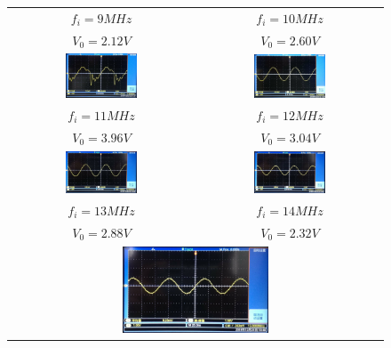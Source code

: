 \documentclass[12pt]{article}%
\numberwithin{equation}{section}
\begin{document}
\begin{enumerate}
\begin{figure}[htbp]
\begin{tabular}{cc}
$f_i=9MHz$&$f_i=10MHz$\\
$V_0=2.12V$&$V_0=2.60V$\\
\includegraphics[width=0.4\textwidth]{gaopin4/gaopin410.jpg}&\includegraphics[width=0.4\textwidth]{gaopin4/gaopin413.jpg}\\
$f_i=11MHz$&$f_i=12MHz$\\
$V_0=3.96V$&$V_0=3.04V$\\
\includegraphics[width=0.4\textwidth]{gaopin4/gaopin412.jpg}&\includegraphics[width=0.4\textwidth]{gaopin4/gaopin411.jpg}\\
$f_i=13MHz$&$f_i=14MHz$\\
$V_0=2.88V$&$V_0=2.32V$\\
\multicolumn{2}{c}{\includegraphics[width=0.4\textwidth]{gaopin4/gaopin414.jpg}}\\

\end{tabular}
\end{figure}
\end{enumerate}
\end{document}

